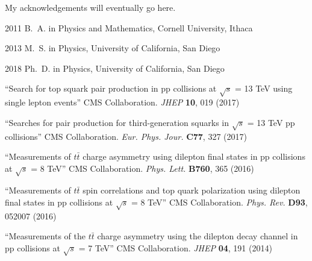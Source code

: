 \begin{frontmatter}
%
\tableofcontents
\listoffigures  %
\listoftables   %



%
%
\begin{acknowledgements}
My acknowledgements will eventually go here. %
\end{acknowledgements}


%
%
\begin{vitapage}
\begin{vita}
  \item[2011] B.~A. in Physics and Mathematics, Cornell University, Ithaca
  \item[2013] M.~S. in Physics, University of California, San Diego
  \item[2018] Ph.~D. in Physics, University of California, San Diego
\end{vita}
\begin{publications}
  \item ``Search for top squark pair production in pp collisions at $\sqrt{s}$ = 13 TeV using single lepton events'' CMS Collaboration. \emph{JHEP} \textbf{10}, 019 (2017) %
  \item ``Searches for pair production for third-generation squarks in $\sqrt{s}$ = 13 TeV pp collisions'' CMS Collaboration. \emph{Eur. Phys. Jour.} \textbf{C77}, 327 (2017) %
  \item ``Measurements of $t\bar{t}$ charge asymmetry using dilepton final states in pp collisions at $\sqrt{s}$ = 8 TeV'' CMS Collaboration. \emph{Phys. Lett.} \textbf{B760}, 365 (2016) %
  \item ``Measurements of $t\bar{t}$ spin correlations and top quark polarization using dilepton final states in pp collisions at $\sqrt{s}$ = 8 TeV'' CMS Collaboration. \emph{Phys. Rev.} \textbf{D93}, 052007 (2016) %
  \item ``Measurements of the $t\bar{t}$ charge asymmetry using the dilepton decay channel in pp collisions at $\sqrt{s}$ = 7 TeV'' CMS Collaboration. \emph{JHEP} \textbf{04}, 191 (2014) %
\end{publications}
\end{vitapage}



\end{frontmatter}
